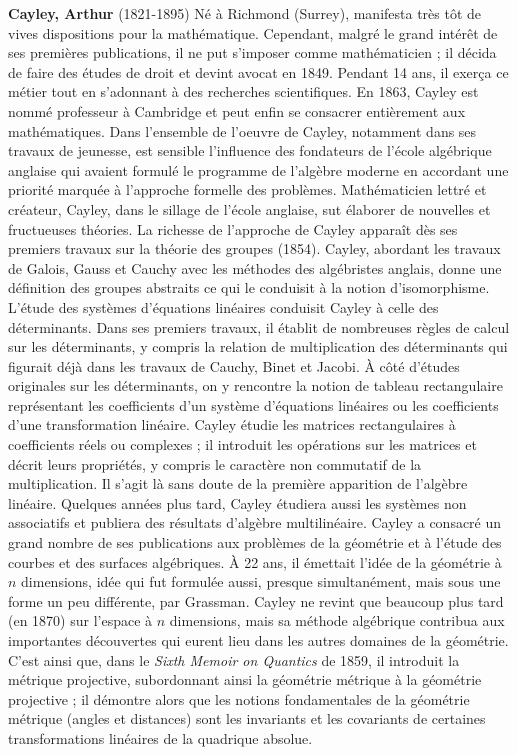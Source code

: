 \textbf{Cayley, Arthur} (1821-1895) Né à Richmond (Surrey), manifesta très tôt de vives dispositions pour la mathématique. Cependant, malgré le grand intérêt de ses premières publications, il ne put s'imposer comme mathématicien ; il décida de faire des études de droit et devint avocat en 1849. Pendant 14 ans, il exerça ce métier tout en s'adonnant à des recherches scientifiques. En 1863, Cayley est nommé professeur à Cambridge et peut enfin se consacrer entièrement aux mathématiques. Dans l'ensemble de l'oeuvre de Cayley, notamment dans ses travaux de jeunesse, est sensible l'influence des fondateurs de l'école algébrique anglaise qui avaient formulé le programme de l'algèbre moderne en accordant une priorité marquée à l'approche formelle des problèmes. Mathématicien lettré et créateur, Cayley, dans le sillage de l'école anglaise, sut élaborer de nouvelles et fructueuses théories. La richesse de l'approche de Cayley apparaît dès ses premiers travaux sur la théorie des groupes (1854). Cayley, abordant les travaux de Galois, Gauss et Cauchy avec les méthodes des algébristes anglais, donne une définition des groupes abstraits ce qui le conduisit à la notion d'isomorphisme. L'étude des systèmes d'équations linéaires conduisit Cayley à celle des déterminants. Dans ses premiers travaux, il établit de nombreuses règles de calcul sur les déterminants, y compris la relation de multiplication des déterminants qui figurait déjà dans les travaux de Cauchy, Binet et Jacobi. À côté d'études originales sur les déterminants, on y rencontre la notion de tableau rectangulaire représentant les coefficients d'un système d'équations linéaires ou les coefficients d'une transformation linéaire. Cayley étudie les matrices rectangulaires à coefficients réels ou complexes ; il introduit les opérations sur les matrices et décrit leurs propriétés, y compris le caractère non commutatif de la multiplication. Il s'agit là sans doute de la première apparition de l'algèbre linéaire. Quelques années plus tard, Cayley étudiera aussi les systèmes non associatifs et publiera des résultats d'algèbre multilinéaire. Cayley a consacré un grand nombre de ses publications aux problèmes de la géométrie et à l'étude des courbes et des surfaces algébriques. À 22 ans, il émettait l'idée de la géométrie à $n$ dimensions, idée qui fut formulée aussi, presque simultanément, mais sous une forme un peu différente, par Grassman. Cayley ne revint que beaucoup plus tard (en 1870) sur l'espace à $n$ dimensions, mais sa méthode algébrique contribua aux importantes découvertes qui eurent lieu dans les autres domaines de la géométrie. C'est ainsi que, dans le \textit{Sixth Memoir on Quantics} de 1859, il introduit la métrique projective, subordonnant ainsi la géométrie métrique à la géométrie projective ; il démontre alors que les notions fondamentales de la géométrie métrique (angles et distances) sont les invariants et les covariants de certaines transformations linéaires de la quadrique absolue.

